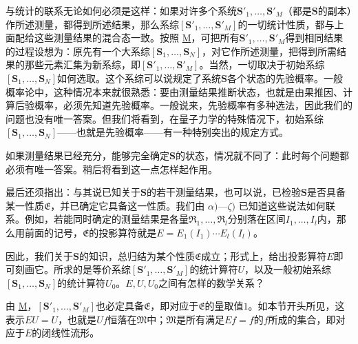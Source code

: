 \documentclass[fontsize=13pt,twoside,openany,headings=normal,parskip=false,bookmarkpackage=false,DIV=calc]{scrbook}
\begin{document}
与统计的联系无论如何必须是这样：如果对许多个系统$\boldsymbol{S}'_1,\allowbreak \ldots,\allowbreak \boldsymbol{S}'_M$（都是$\boldsymbol{S}$的副本）作所述测量，都得到所述结果，那么系综$[\boldsymbol{S}'_1,\allowbreak \ldots,\allowbreak \boldsymbol{S}'_M]$的一切统计性质，都与上面配给这些测量结果的混合态一致。按照 \hyperref[post:IV.3.M]{M}，可把所有$\boldsymbol{S}'_1,\allowbreak \ldots,\allowbreak \boldsymbol{S}'_M$得到相同结果的过程设想为：原先有一个大系综$[\boldsymbol{S}_1,\allowbreak \ldots,\allowbreak \boldsymbol{S}_N]$，对它作所述测量，把得到所需结果的那些元素汇集为新系综，即$[\boldsymbol{S}'_1,\allowbreak \ldots,\allowbreak \boldsymbol{S}'_M]$。当然，一切取决于初始系综$[\boldsymbol{S}_1,\allowbreak \ldots,\allowbreak \boldsymbol{S}_N]$如何选取。这个系综可以说规定了系统$\boldsymbol{S}$各个状态的先验概率。一般概率论中，这种情况本来就很熟悉：要由测量结果推断状态，也就是由果推因、计算后验概率，必须先知道先验概率。一般说来，先验概率有多种选法，因此我们的问题也没有唯一答案。但我们将看到，在量子力学的特殊情况下，初始系综$[\boldsymbol{S}_1,\allowbreak \ldots,\allowbreak \boldsymbol{S}_N]$——也就是先验概率——有一种特别突出的规定方式。

如果测量结果已经充分，能够完全确定$\boldsymbol{S}$的状态，情况就不同了：此时每个问题都必须有唯一答案。稍后将看到这一点怎样起作用。

最后还须指出：与其说已知关于$\boldsymbol{S}$的若干测量结果，也可以说，已检验$\boldsymbol{S}$是否具备某一性质$\mathfrak E$，并已确定它\hypertarget{origpage-180}{}\label{origpage-180}具备这一性质。我们由 \hyperref[post:III.5.alpha]{$\alpha)$}—\hyperref[post:III.5.zeta]{$\zeta)$} 已知道这些说法如何联系。例如，若能同时确定的测量结果是各量$\mathfrak R_1,\allowbreak \ldots,\allowbreak \mathfrak R_l$分别落在区间$I_1,\allowbreak \ldots,\allowbreak I_l$内，那么用前面的记号，$\mathfrak E$的投影算符就是$E=E_1(I_1)\cdots E_l(I_l)$。

因此，我们关于$\boldsymbol{S}$的知识，总归结为某个性质$\mathfrak E$成立；形式上，给出投影算符$E$即可刻画它。所求的是等价系综$[\boldsymbol{S}'_1,\allowbreak \ldots,\allowbreak \boldsymbol{S}'_M]$的统计算符$U$，以及一般初始系综$[\boldsymbol{S}_1,\allowbreak \ldots,\allowbreak \boldsymbol{S}_N]$的统计算符$U_0$。$E,\allowbreak U,\allowbreak U_0$之间有怎样的数学关系？

由 \hyperref[post:IV.3.M]{M}，$[\boldsymbol{S}'_1,\allowbreak \ldots,\allowbreak \boldsymbol{S}'_M]$也必定具备$\mathfrak E$，即对应于$\mathfrak E$的量取值$1$。如本节开头所见，这表示$EU=U$，也就是$Uf$恒落在$\mathfrak M$中；$\mathfrak M$是所有满足$Ef=f$的$f$所成的集合，即对应于$E$的闭线性流形。
\end{document}

